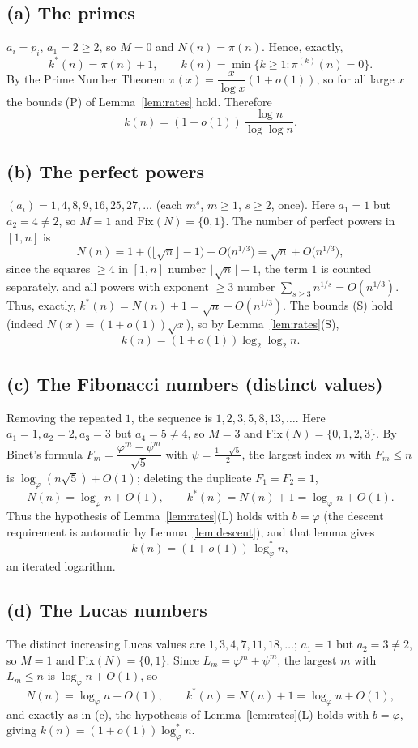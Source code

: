 \documentclass[12pt]{article}
\theoremstyle{definition}
\begin{document}
\subsection{(a) The primes}
$a_i=p_i$, $a_1=2\ge2$, so $M=0$ and $N(n)=\pi(n)$. Hence, exactly,
\[
  k^*(n)=\pi(n)+1,\qquad k(n)=\min\{k\ge1:\pi^{(k)}(n)=0\}.
\]
By the Prime Number Theorem $\pi(x)=\dfrac{x}{\log x}(1+o(1))$, so for all large $x$
the bounds (P) of Lemma~\ref{lem:rates} hold. Therefore
\[
  k(n)=(1+o(1))\,\frac{\log n}{\log\log n}.
\]

\subsection{(b) The perfect powers}
$(a_i)=1,4,8,9,16,25,27,\dots$ (each $m^s$, $m\ge1$, $s\ge2$, once). Here $a_1=1$ but
$a_2=4\ne2$, so $M=1$ and $\mathrm{Fix}(N)=\{0,1\}$. The number of perfect powers in
$[1,n]$ is
\[
  N(n)=1+\bigl(\lfloor\sqrt n\rfloor-1\bigr)+O\!\bigl(n^{1/3}\bigr)
      =\sqrt n+O\!\bigl(n^{1/3}\bigr),
\]
since the squares $\ge4$ in $[1,n]$ number $\lfloor\sqrt n\rfloor-1$, the term $1$ is
counted separately, and all powers with exponent $\ge3$ number
$\sum_{s\ge3}n^{1/s}=O(n^{1/3})$. Thus, exactly, $k^*(n)=N(n)+1=\sqrt n+O(n^{1/3})$.
The bounds (S) hold (indeed $N(x)=(1+o(1))\sqrt x$), so by Lemma~\ref{lem:rates}(S),
\[
  k(n)=(1+o(1))\log_2\log_2 n.
\]

\subsection{(c) The Fibonacci numbers (distinct values)}
Removing the repeated $1$, the sequence is $1,2,3,5,8,13,\dots$. Here $a_1=1,a_2=2,
a_3=3$ but $a_4=5\ne4$, so $M=3$ and $\mathrm{Fix}(N)=\{0,1,2,3\}$. By Binet's formula
$F_m=\dfrac{\varphi^m-\psi^m}{\sqrt5}$ with $\psi=\tfrac{1-\sqrt5}2$, the largest
index $m$ with $F_m\le n$ is $\log_\varphi(n\sqrt5)+O(1)$; deleting the duplicate
$F_1=F_2=1$,
\[
  N(n)=\log_\varphi n+O(1),\qquad k^*(n)=N(n)+1=\log_\varphi n+O(1).
\]
Thus the hypothesis of Lemma~\ref{lem:rates}(L) holds with $b=\varphi$ (the
descent requirement is automatic by Lemma~\ref{lem:descent}), and that lemma gives
\[
  k(n)=(1+o(1))\,\log^*_\varphi n,
\]
an iterated logarithm.

\subsection{(d) The Lucas numbers}
The distinct increasing Lucas values are $1,3,4,7,11,18,\dots$; $a_1=1$ but $a_2=3\ne2$,
so $M=1$ and $\mathrm{Fix}(N)=\{0,1\}$. Since $L_m=\varphi^m+\psi^m$, the largest $m$
with $L_m\le n$ is $\log_\varphi n+O(1)$, so
\[
  N(n)=\log_\varphi n+O(1),\qquad k^*(n)=N(n)+1=\log_\varphi n+O(1),
\]
and exactly as in (c), the hypothesis of Lemma~\ref{lem:rates}(L) holds with
$b=\varphi$, giving $k(n)=(1+o(1))\log^*_\varphi n$.
\end{document}
